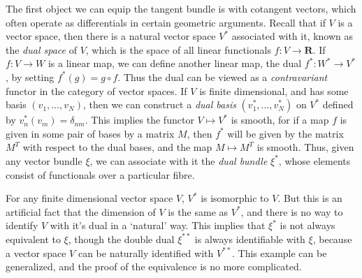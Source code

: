 The first object we can equip the tangent bundle is with cotangent vectors, which often operate as differentials in certain geometric arguments. Recall that if $V$ is a vector space, then there is a natural vector space $V^*$ associated with it, known as the {\it dual space} of $V$, which is the space of all linear functionals $f: V \to \mathbf{R}$. If $f: V \to W$ is a linear map, we can define another linear map, the dual $f^*: W^* \to V^*$, by setting $f^*(g) = g \circ f$. Thus the dual can be viewed as a {\it contravariant} functor in the category of vector spaces. If $V$ is finite dimensional, and has some basis $(v_1, \dots, v_N)$, then we can construct a {\it dual basis} $(v_1^*, \dots, v_N^*)$ on $V^*$ defined by $v_n^*(v_m) = \delta_{nm}$. This implies the functor $V \mapsto V^*$ is smooth, for if a map $f$ is given in some pair of bases by a matrix $M$, then $f^*$ will be given by the matrix $M^T$ with respect to the dual bases, and the map $M \mapsto M^T$ is smooth. Thus, given any vector bundle $\xi$, we can associate with it the {\it dual bundle} $\xi^*$, whose elements consist of functionals over a particular fibre.

For any finite dimensional vector space $V$, $V^*$ is isomorphic to $V$. But this is an artificial fact that the dimension of $V$ is the same as $V^*$, and there is no way to identify $V$ with it's dual in a `natural' way. This implies that $\xi^*$ is not always equivalent to $\xi$, though the double dual $\xi^{**}$ is always identifiable with $\xi$, because a vector space $V$ can be naturally identified with $V^{**}$. This example can be generalized, and the proof of the equivalence is no more complicated.

